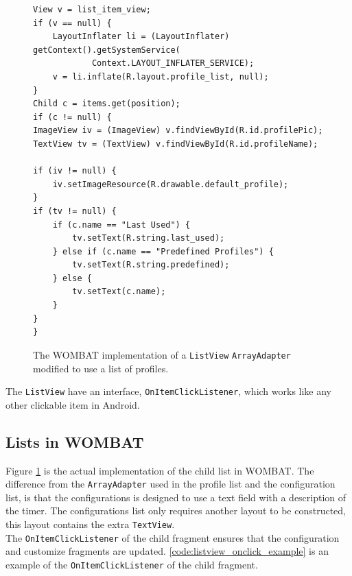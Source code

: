 \begin{figure}[H]
	\centering
	\begin{lstlisting}
View v = list_item_view;
if (v == null) {
	LayoutInflater li = (LayoutInflater) getContext().getSystemService(
			Context.LAYOUT_INFLATER_SERVICE);
	v = li.inflate(R.layout.profile_list, null);
}
Child c = items.get(position);
if (c != null) {
ImageView iv = (ImageView) v.findViewById(R.id.profilePic);
TextView tv = (TextView) v.findViewById(R.id.profileName);

if (iv != null) {
	iv.setImageResource(R.drawable.default_profile);
}
if (tv != null) {
	if (c.name == "Last Used") {
		tv.setText(R.string.last_used);
	} else if (c.name == "Predefined Profiles") {
		tv.setText(R.string.predefined);
	} else {
		tv.setText(c.name);
	}
}
}
\end{lstlisting}
	\caption{The WOMBAT implementation of a \texttt{ListView} \texttt{ArrayAdapter} modified to use a list of profiles.}
	\label{code:listview_adapter_example}
\end{figure}

The \texttt{ListView} have an interface, \texttt{OnItemClickListener}, which works like any other clickable item in Android.

\subsection{Lists in WOMBAT}
Figure \ref{code:listview_adapter_example} is the actual implementation of the child list in WOMBAT. The difference from the \texttt{ArrayAdapter} used in the profile list and the configuration list, is that the configurations is designed to use a text field with a description of the timer.
The configurations list only requires another layout to be constructed, this layout contains the extra \texttt{TextView}.\\

The \texttt{OnItemClickListener} of the child fragment ensures that the configuration and customize fragments are updated. \autoref{code:listview_onclick_example} is an example of the \texttt{OnItemClickListener} of the child fragment.

